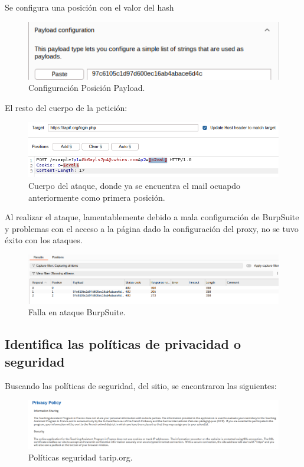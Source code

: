 \documentclass[letter,12pt]{article}
\begin{document}
Se configura una posición con el valor del hash

\begin{figure}[H]
            \centering
            \includegraphics[width=0.5\linewidth]{payload.png}
        \caption{\label{fig:11} Configuración Posición Payload. }
    \end{figure}

El resto del cuerpo de la petición:

\begin{figure}[H]
            \centering
            \includegraphics[width=0.8\linewidth]{cuerpoataque.png}
        \caption{\label{fig:12} Cuerpo del ataque, donde ya se encuentra el mail ocuapdo anteriormente como primera posición. }
    \end{figure}

Al realizar el ataque, lamentablemente debido a mala configuración de BurpSuite y problemas con el acceso a la página dado la configuración del proxy, no se tuvo éxito con los ataques.

\begin{figure}[H]
            \centering
            \includegraphics[width=1\linewidth]{fallaataque.png}
        \caption{\label{fig:13} Falla en ataque BurpSuite. }
    \end{figure}

\subsection{Identifica las políticas de privacidad o seguridad}

Buscando las políticas de seguridad, del sitio, se encontraron las siguientes:

\begin{figure}[H]
            \centering
            \includegraphics[width=1.1\linewidth]{politicas.png}
        \caption{\label{fig:14} Políticas seguridad tarip.org. }
    \end{figure}
\end{document}
